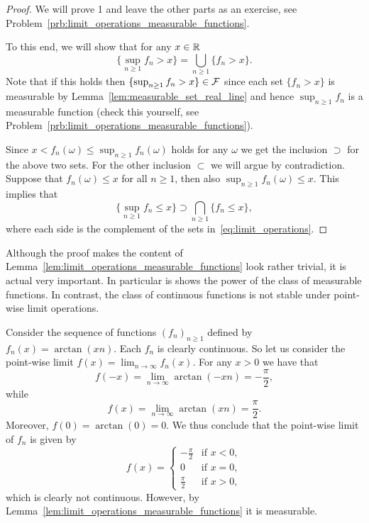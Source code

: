 \begin{proof}
We will prove 1 and leave the other parts as an exercise, see Problem~\ref{prb:limit_operations_measurable_functions}. 

To this end, we will show that for any $x \in \mathbb R$
\begin{equation}\label{eq:limit_operations}
	\{\sup_{n \ge 1} f_n > x\} = \bigcup_{n \ge 1} \{f_n > x\}.
\end{equation}
Note that if this holds then $\{\sup_{n \ge 1} f_n > x\} \in \mathcal F$ since each set $\{f_n > x\}$ is measurable by Lemma~\ref{lem:measurable_set_real_line} and hence $\sup_{n \ge 1} f_n$ is a measurable function (check this yourself, see Problem~\ref{prb:limit_operations_measurable_functions}).

Since $x < f_n(\omega) \le \sup_{n \ge 1} f_n(\omega)$ holds for any $\omega$ we get the inclusion $\supset$ for the above two sets. For the other inclusion $\subset$ we will argue by contradiction. Suppose that $f_n(\omega) \le x$ for all $n \ge 1$, then also $\sup_{n \ge 1} f_n(\omega) \le x$. This implies that
\[
	\{\sup_{n \ge 1} f_n \le x\} \supset \bigcap_{n \ge 1} \{f_n \le x\},
\] 
where each side is the complement of the sets in~\eqref{eq:limit_operations}.
\end{proof}

Although the proof makes the content of Lemma~\ref{lem:limit_operations_measurable_functions} look rather trivial, it is actual very important. In particular is shows the power of the class of measurable functions. In contrast, the class of continuous functions is not stable under point-wise limit operations. 

\begin{example}
Consider the sequence of functions $(f_n)_{n \ge 1}$ defined by $f_n(x) = \arctan(xn)$. Each $f_n$ is clearly continuous. So let us consider the point-wise limit $f(x) = \lim_{n \to \infty} f_n(x)$. For any $x > 0$ we have that
\[
	f(-x) = \lim_{n \to \infty} \arctan(-x n) = -\frac{\pi}{2},
\]
while
\[
	f(x) = \lim_{n \to \infty} \arctan(x n) = \frac{\pi}{2}.
\]
Moreover, $f(0) = \arctan(0) = 0$. We thus conclude that the point-wise limit of $f_n$ is given by
\[
	f(x) = \begin{cases}
		-\frac{\pi}{2} &\text{if } x < 0,\\
		0 &\text{if } x = 0,\\
		\frac{\pi}{2} &\text{if } x >0,
	\end{cases}
\]
which is clearly not continuous. However, by Lemma~\ref{lem:limit_operations_measurable_functions} it is measurable.
\end{example}


